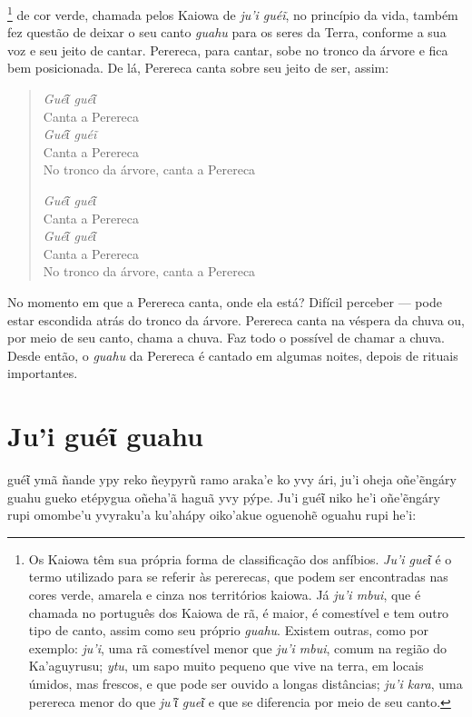 \footnote{Os Kaiowa têm sua própria forma de classificação dos
  anfíbios. \textit{Ju'i gueῖ} é o termo utilizado para se referir às
  pererecas, que podem ser encontradas nas cores verde, amarela e cinza
  nos territórios kaiowa. Já \textit{ju'i mbui}, que é chamada no
  português dos Kaiowa de rã, é maior, é comestível e tem outro tipo de
  canto, assim como seu próprio \textit{guahu}. Existem outras, como por
  exemplo: \textit{ju'i}, uma rã comestível menor que \textit{ju'i mbui},
  comum na região do Ka'aguyrusu; \textit{ytu}, um sapo muito pequeno que
  vive na terra, em locais úmidos, mas frescos, e que pode ser ouvido a
  longas distâncias; \textit{ju'i kara}, uma perereca menor do que
  \textit{ju'ῖ gueῖ} e que se diferencia por meio de seu canto.} de cor
verde, chamada pelos Kaiowa de \textit{ju'i guéĩ}, no princípio da vida,
também fez questão de deixar o seu canto \textit{guahu} para os seres da
Terra, conforme a sua voz e seu jeito de cantar. Perereca, para cantar,
sobe no tronco da árvore e fica bem posicionada. De lá, Perereca canta
sobre seu jeito de ser, assim:

\begin{verse}
\textit{Guéῖ guéῖ}\\
Canta a Perereca\\
\textit{Guéῖ guéĩ}\\
Canta a Perereca\\
No tronco da árvore, canta a Perereca

\textit{Guéῖ guéῖ}\\
Canta a Perereca\\
\textit{Guéῖ guéῖ}\\
Canta a Perereca\\
No tronco da árvore, canta a Perereca
\end{verse}

No momento em que a Perereca canta, onde ela está? Difícil perceber ---
pode estar escondida atrás do tronco da árvore. Perereca canta na
véspera da chuva ou, por meio de seu canto, chama a chuva. Faz todo o
possível de chamar a chuva. Desde então, o \textit{guahu} da Perereca é
cantado em algumas noites, depois de rituais importantes.

\chapter{Ju'i guéῖ guahu}

 guéῖ ymã ñande ypy reko ñeypyrũ ramo araka'e ko yvy ári, ju'i oheja
oñe'ẽngáry guahu gueko etépygua oñeha'ã haguã yvy pýpe. Ju'i guéῖ niko
he'i oñe'ẽngáry rupi omombe'u yvyraku'a ku'ahápy oiko'akue oguenohẽ
oguahu rupi he'i:


